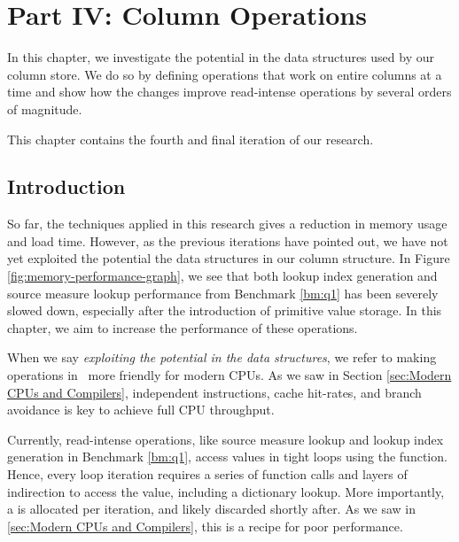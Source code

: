 \chapter{Part IV: Column Operations}
\label{chap:operations}

In this chapter, we investigate the potential in the data structures used by our column store. We do so by defining operations that work on entire columns at a time and show how the changes improve read-intense operations by several orders of magnitude.

This chapter contains the fourth and final iteration of our research.

\clearpage

\section{Introduction}
\label{sec:Introduction}
So far, the techniques applied in this research gives a reduction in memory usage and load time. However, as the previous iterations have pointed out, we have not yet exploited the potential the data structures in our column structure. In Figure \ref{fig:memory-performance-graph}, we see that both lookup index generation and source measure lookup performance from Benchmark \ref{bm:q1} has been severely slowed down, especially after the introduction of primitive value storage. In this chapter, we aim to increase the performance of these operations.

When we say \textit{exploiting the potential in the data structures}, we refer to making operations in \gap~more friendly for modern CPUs. As we saw in Section \ref{sec:Modern CPUs and Compilers}, independent instructions, cache hit-rates, and branch avoidance is key to achieve full CPU throughput. 

Currently, read-intense operations, like source measure lookup and lookup index generation in Benchmark \ref{bm:q1}, access values in tight loops using the  function. Hence, every loop iteration requires a series of function calls and layers of indirection to access the value, including a dictionary lookup. More importantly, a  is allocated per iteration, and likely discarded shortly after. As we saw in \ref{sec:Modern CPUs and Compilers}, this is a recipe for poor performance.

